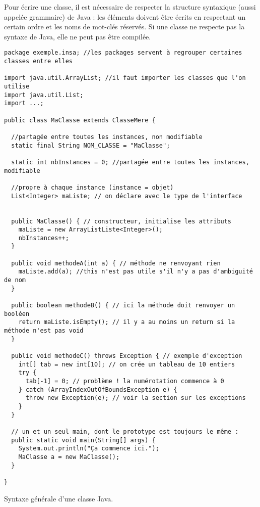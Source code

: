 \documentclass[10pt]{article}
\begin{document}
Pour écrire une classe, il est nécessaire de respecter la structure syntaxique (aussi appelée grammaire)
de Java : les éléments doivent être écrits en respectant un certain ordre et les noms
de mot-clés réservés. Si une classe ne respecte pas la syntaxe de Java, elle ne peut pas être compilée.


\begin{listing}[h!]
\begin{verbatim}
package exemple.insa; //les packages servent à regrouper certaines classes entre elles

import java.util.ArrayList; //il faut importer les classes que l'on utilise
import java.util.List;
import ...;

public class MaClasse extends ClasseMere {

  //partagée entre toutes les instances, non modifiable
  static final String NOM_CLASSE = "MaClasse"; 

  static int nbInstances = 0; //partagée entre toutes les instances, modifiable

  //propre à chaque instance (instance = objet) 
  List<Integer> maListe; // on déclare avec le type de l'interface


  public MaClasse() { // constructeur, initialise les attributs
    maListe = new ArrayListListe<Integer>();
    nbInstances++;
  }

  public void methodeA(int a) { // méthode ne renvoyant rien
    maListe.add(a); //this n'est pas utile s'il n'y a pas d'ambiguité de nom
  }

  public boolean methodeB() { // ici la méthode doit renvoyer un booléen
    return maListe.isEmpty(); // il y a au moins un return si la méthode n'est pas void
  }

  public void methodeC() throws Exception { // exemple d'exception
    int[] tab = new int[10]; // on crée un tableau de 10 entiers
    try {
      tab[-1] = 0; // problème ! la numérotation commence à 0
    } catch (ArrayIndexOutOfBoundsException e) {
      throw new Exception(e); // voir la section sur les exceptions
    }
  }

  // un et un seul main, dont le prototype est toujours le même :
  public static void main(String[] args) {
    System.out.println("Ça commence ici.");
    MaClasse a = new MaClasse();
  }
  
}

\end{verbatim}
\caption{Syntaxe générale d'une classe Java.
\label{lst.syntax}}
\end{listing}
\end{document}
